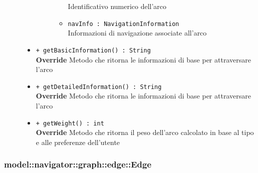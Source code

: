 \documentclass[../DefinizioneDiProdotto.tex]{subfiles}
\begin{document}
\begin{description}
\begin{itemize}
\begin{description}
\begin{itemize}
Identificativo numerico dell'arco\item \texttt{navInfo : NavigationInformation}\\
Informazioni di navigazione associate all'arco\end{itemize}
\end{description}
\item \texttt{+ getBasicInformation() : String}\\
\textbf{Override} Metodo che ritorna le informazioni di base per attraversare l'arco
 \item \texttt{+ getDetailedInformation() : String}\\
\textbf{Override} Metodo che ritorna le informazioni di base per attraversare l'arco
 \item \texttt{+ getWeight() : int}\\
\textbf{Override} Metodo che ritorna il peso dell'arco calcolato in base al tipo e alle preferenze dell'utente
 \end{itemize}
\end{description}

\subsubsection{model::navigator::graph::edge::Edge}
\end{document}
